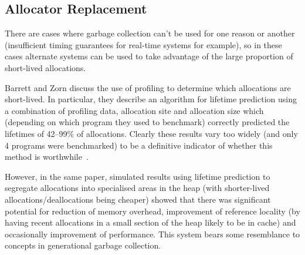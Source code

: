 \subsection{Allocator Replacement}

There are cases where garbage collection can't be used for one reason or another (insufficient timing guarantees for real-time systems for example), so in these cases alternate systems can be used to take advantage of the large proportion of short-lived allocations.

Barrett and Zorn discuss the use of profiling to determine which allocations are short-lived. In particular, they describe an algorithm for lifetime prediction using a combination of profiling data, allocation site and allocation size which (depending on which program they used to benchmark) correctly predicted the lifetimes of 42–99\% of allocations. Clearly these results vary too widely (and only 4 programs were benchmarked) to be a definitive indicator of whether this method is worthwhile~\cite{predictors}.

However, in the same paper, simulated results using lifetime prediction to segregate allocations into specialised areas in the heap (with shorter-lived allocations/deallocations being cheaper) showed that there was significant potential for reduction of memory overhead, improvement of reference locality (by having recent allocations in a small section of the heap likely to be in cache) and occasionally improvement of performance. This system bears some resemblance to concepts in generational garbage collection.
